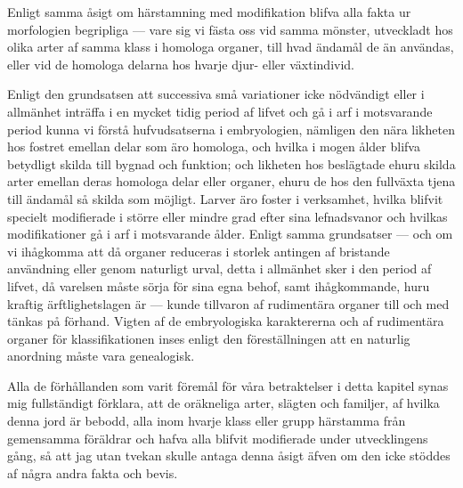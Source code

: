 Enligt samma åsigt om härstamning med modifikation blifva alla fakta ur morfologien begripliga — vare sig vi fästa oss vid samma mönster, utveckladt hos olika arter af samma klass i homologa organer, till hvad ändamål de än användas, eller vid de homologa delarna hos hvarje djur- eller växtindivid.

Enligt den grundsatsen att successiva små variationer icke nödvändigt eller i allmänhet inträffa i en mycket tidig period af lifvet och gå i arf i motsvarande period kunna vi förstå hufvudsatserna i embryologien, nämligen den nära likheten hos fostret emellan delar som äro homologa, och hvilka i mogen ålder blifva betydligt skilda till bygnad och funktion; och likheten hos beslägtade ehuru skilda arter emellan deras homologa delar eller organer, ehuru de hos den fullväxta tjena till ändamål så skilda som möjligt. Larver äro foster i verksamhet, hvilka blifvit specielt modifierade i större eller mindre grad efter sina lefnadsvanor och hvilkas modifikationer gå i arf i motsvarande ålder. Enligt samma grundsatser — och om vi ihågkomma att då organer reduceras i storlek antingen af bristande användning eller genom naturligt urval, detta i allmänhet sker i den period af lifvet, då varelsen måste sörja för sina egna behof, samt ihågkommande, huru kraftig ärftlighetslagen är — kunde tillvaron af rudimentära organer till och med tänkas på förhand. Vigten af de embryologiska karaktererna och af rudimentära organer för klassifikationen inses enligt den föreställningen att en naturlig anordning måste vara genealogisk.

Alla de förhållanden som varit föremål för våra betraktelser i detta kapitel synas mig fullständigt förklara, att de oräkneliga arter, slägten och familjer, af hvilka denna jord är bebodd, alla inom hvarje klass eller grupp härstamma från gemensamma föräldrar och hafva alla blifvit modifierade under utvecklingens gång, så att jag utan tvekan skulle antaga denna åsigt äfven om den icke stöddes af några andra fakta och bevis.


